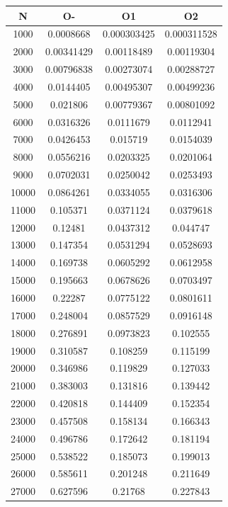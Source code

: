 \begin{center}
\begin{tabular}{| c | c | c | c |}
\hline
\textbf{N} & \textbf{O-} & \textbf{O1} & \textbf{O2} \\ \hline
1000 & 0.0008668 & 0.000303425 & 0.000311528 \\ \hline
2000 & 0.00341429 & 0.00118489 & 0.00119304 \\ \hline
3000 & 0.00796838 & 0.00273074 & 0.00288727 \\ \hline
4000 & 0.0144405 & 0.00495307 & 0.00499236 \\ \hline
5000 & 0.021806 & 0.00779367 & 0.00801092 \\ \hline
6000 & 0.0316326 & 0.0111679 & 0.0112941 \\ \hline
7000 & 0.0426453 & 0.015719 & 0.0154039 \\ \hline
8000 & 0.0556216 & 0.0203325 & 0.0201064 \\ \hline
9000 & 0.0702031 & 0.0250042 & 0.0253493 \\ \hline
10000 & 0.0864261 & 0.0334055 & 0.0316306 \\ \hline
11000 & 0.105371 & 0.0371124 & 0.0379618 \\ \hline
12000 & 0.12481 & 0.0437312 & 0.044747 \\ \hline
13000 & 0.147354 & 0.0531294 & 0.0528693 \\ \hline
14000 & 0.169738 & 0.0605292 & 0.0612958 \\ \hline
15000 & 0.195663 & 0.0678626 & 0.0703497 \\ \hline
16000 & 0.22287 & 0.0775122 & 0.0801611 \\ \hline
17000 & 0.248004 & 0.0857529 & 0.0916148 \\ \hline
18000 & 0.276891 & 0.0973823 & 0.102555 \\ \hline
19000 & 0.310587 & 0.108259 & 0.115199 \\ \hline
20000 & 0.346986 & 0.119829 & 0.127033 \\ \hline
21000 & 0.383003 & 0.131816 & 0.139442 \\ \hline
22000 & 0.420818 & 0.144409 & 0.152354 \\ \hline
23000 & 0.457508 & 0.158134 & 0.166343 \\ \hline
24000 & 0.496786 & 0.172642 & 0.181194 \\ \hline
25000 & 0.538522 & 0.185073 & 0.199013 \\ \hline
26000 & 0.585611 & 0.201248 & 0.211649 \\ \hline
27000 & 0.627596 & 0.21768 & 0.227843 \\ \hline

\end{tabular}
\end{center}
